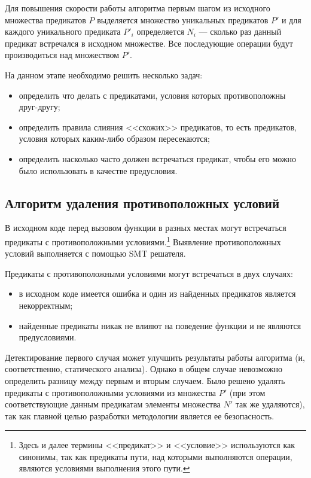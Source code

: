 Для повышения скорости работы алгоритма первым шагом из исходного множества предикатов $P$ выделяется множество уникальных предикатов $P'$ и для каждого уникального предиката $P'_i$ определяется $N_i$ --- сколько раз данный предикат встречался в исходном множестве. Все последующие операции будут производиться над множеством $P'$.

На данном этапе необходимо решить несколько задач:
\begin{itemize}
\item определить что делать с предикатами, условия которых противоположны друг-другу;
\item определить правила слияния <<схожих>> предикатов, то есть предикатов, условия которых каким-либо образом пересекаются;
\item определить насколько часто должен встречаться предикат, чтобы его можно было использовать в качестве предусловия.
\end{itemize}

\subsection{Алгоритм удаления противоположных условий}
В исходном коде перед вызовом функции в разных местах могут встречаться предикаты с противоположными условиями.\footnote{Здесь и далее термины <<предикат>> и <<условие>> используются как синонимы, так как предикаты пути, над которыми выполняются операции, являются условиями выполнения этого пути.} Выявление противоположных условий выполняется с помощью SMT решателя. 

Предикаты с противоположными условиями могут встречаться в двух случаях:
\begin{itemize}
\item в исходном коде имеется ошибка и один из найденных предикатов является некорректным;
\item найденные предикаты никак не влияют на поведение функции и не являются предусловиями.
\end{itemize}
Детектирование первого случая может улучшить результаты работы алгоритма (и, соответственно, статического анализа). Однако в общем случае невозможно определить разницу между первым и вторым случаем. Было решено удалять предикаты с противоположными условиями из множества $P'$ (при этом соответствующие данным предикатам элементы множества $N'$ так же удаляются), так как главной целью разработки методологии является ее безопасность.

